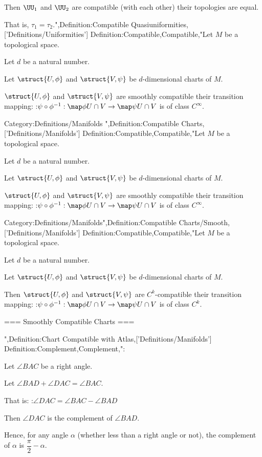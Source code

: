 Then $\UU_1$ and $\UU_2$ are compatible (with each other)  their topologies are equal.

That is,  $\tau_1 = \tau_2$.",Definition:Compatible Quasiuniformities,['Definitions/Uniformities']
Definition:Compatible,Compatible,"Let $M$ be a topological space.

Let $d$ be a natural number.

Let $\struct {U, \phi}$ and $\struct {V, \psi}$ be $d$-dimensional charts of $M$.


$\struct {U, \phi}$ and $\struct {V, \psi}$ are smoothly compatible  their transition mapping:
:$\psi \circ \phi^{-1} : \map \phi {U \cap V} \to \map \psi {U \cap V}$
is of class $C^\infty$.


Category:Definitions/Manifolds
",Definition:Compatible Charts,['Definitions/Manifolds']
Definition:Compatible,Compatible,"Let $M$ be a topological space.

Let $d$ be a natural number.

Let $\struct {U, \phi}$ and $\struct {V, \psi}$ be $d$-dimensional charts of $M$.


$\struct {U, \phi}$ and $\struct {V, \psi}$ are smoothly compatible  their transition mapping:
:$\psi \circ \phi^{-1} : \map \phi {U \cap V} \to \map \psi {U \cap V}$
is of class $C^\infty$.


Category:Definitions/Manifolds",Definition:Compatible Charts/Smooth,['Definitions/Manifolds']
Definition:Compatible,Compatible,"Let $M$ be a topological space.

Let $d$ be a natural number.

Let $\struct {U, \phi}$ and $\struct {V, \psi}$ be $d$-dimensional charts of $M$.


Then $\struct {U, \phi}$ and $\struct {V, \psi}$ are $C^k$-compatible  their transition mapping:
:$\psi \circ \phi^{-1}: \map \phi {U \cap V} \to \map \psi {U \cap V}$
is of class $C^k$.


=== Smoothly Compatible Charts ===

",Definition:Chart Compatible with Atlas,['Definitions/Manifolds']
Definition:Complement,Complement,":

Let $\angle BAC$ be a right angle.

Let $\angle BAD + \angle DAC = \angle BAC$.

That is:
:$\angle DAC = \angle BAC - \angle BAD$


Then $\angle DAC$ is the complement of $\angle BAD$.


Hence, for any angle $\alpha$ (whether less than a right angle or not), the complement of $\alpha$ is $\dfrac \pi 2 - \alpha$.

